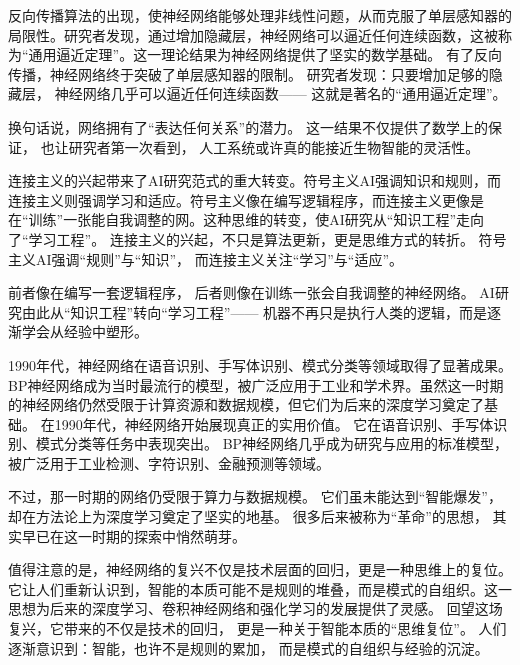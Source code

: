 反向传播算法的出现，使神经网络能够处理非线性问题，从而克服了单层感知器的局限性。研究者发现，通过增加隐藏层，神经网络可以逼近任何连续函数，这被称为“通用逼近定理”。这一理论结果为神经网络提供了坚实的数学基础。
有了反向传播，神经网络终于突破了单层感知器的限制。  
研究者发现：只要增加足够的隐藏层，  
神经网络几乎可以逼近任何连续函数——  
这就是著名的“通用逼近定理”。  

换句话说，网络拥有了“表达任何关系”的潜力。  
这一结果不仅提供了数学上的保证，  
也让研究者第一次看到，  
人工系统或许真的能接近生物智能的灵活性。  

连接主义的兴起带来了AI研究范式的重大转变。符号主义AI强调知识和规则，而连接主义则强调学习和适应。符号主义像在编写逻辑程序，而连接主义更像是在“训练”一张能自我调整的网。这种思维的转变，使AI研究从“知识工程”走向了“学习工程”。
连接主义的兴起，不只是算法更新，更是思维方式的转折。  
符号主义AI强调“规则”与“知识”，  
而连接主义关注“学习”与“适应”。  

前者像在编写一套逻辑程序，  
后者则像在训练一张会自我调整的神经网络。  
AI研究由此从“知识工程”转向“学习工程”——  
机器不再只是执行人类的逻辑，而是逐渐学会从经验中塑形。  

1990年代，神经网络在语音识别、手写体识别、模式分类等领域取得了显著成果。BP神经网络成为当时最流行的模型，被广泛应用于工业和学术界。虽然这一时期的神经网络仍然受限于计算资源和数据规模，但它们为后来的深度学习奠定了基础。
在1990年代，神经网络开始展现真正的实用价值。  
它在语音识别、手写体识别、模式分类等任务中表现突出。  
BP神经网络几乎成为研究与应用的标准模型，  
被广泛用于工业检测、字符识别、金融预测等领域。  

不过，那一时期的网络仍受限于算力与数据规模。  
它们虽未能达到“智能爆发”，  
却在方法论上为深度学习奠定了坚实的地基。  
很多后来被称为“革命”的思想，  
其实早已在这一时期的探索中悄然萌芽。  

值得注意的是，神经网络的复兴不仅是技术层面的回归，更是一种思维上的复位。它让人们重新认识到，智能的本质可能不是规则的堆叠，而是模式的自组织。这一思想为后来的深度学习、卷积神经网络和强化学习的发展提供了灵感。
回望这场复兴，它带来的不仅是技术的回归，  
更是一种关于智能本质的“思维复位”。  
人们逐渐意识到：智能，也许不是规则的累加，  
而是模式的自组织与经验的沉淀。  

